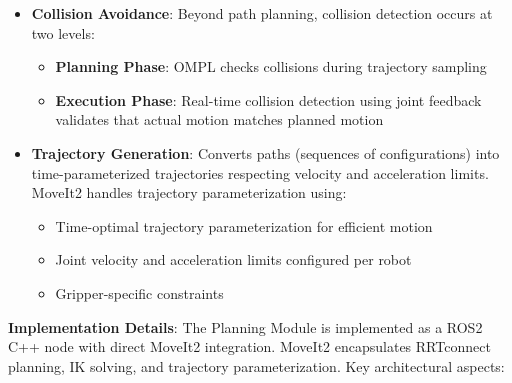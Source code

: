\begin{itemize}
    The path planner operates on a collision model that includes:
    \begin{itemize}
        \item Robot self-collision models (defined in URDF)
        \item Environment obstacles (static table, fixed structures)
        \item Other robot (for collision avoidance between arms)
    \end{itemize}
    
    \item \textbf{Collision Avoidance}: Beyond path planning, collision detection occurs at two levels:
    \begin{itemize}
        \item \textbf{Planning Phase}: OMPL checks collisions during trajectory sampling
        \item \textbf{Execution Phase}: Real-time collision detection using joint feedback validates that actual motion matches planned motion
    \end{itemize}
    
    \item \textbf{Trajectory Generation}: Converts paths (sequences of configurations) into time-parameterized trajectories respecting velocity and acceleration limits. MoveIt2 handles trajectory parameterization using:
    \begin{itemize}
        \item Time-optimal trajectory parameterization for efficient motion
        \item Joint velocity and acceleration limits configured per robot 
        \item Gripper-specific constraints 
    \end{itemize}
\end{itemize}

\textbf{Implementation Details}:
The Planning Module is implemented as a ROS2 C++ node with direct MoveIt2 integration. MoveIt2 encapsulates RRTconnect planning, IK solving, and trajectory parameterization. Key architectural aspects:

